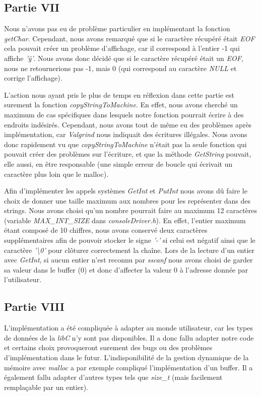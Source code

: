 \documentclass{article}
\begin{document}
\subsection{Partie VII} \label{bugPartieVII}
Nous n'avons pas eu de problème particulier en implémentant la fonction
\textit{getChar}. Cependant, nous avons remarqué que si le caractère récupéré
était \textit{EOF} cela pouvait créer un problème d'affichage, car il
correspond à l'entier -1 qui affiche \textit{'ÿ'}. Nous avons donc décidé que
si le caractère récupéré était un \textit{EOF}, nous ne retournerions pas -1,
mais 0 (qui correspond au caractère \textit{NULL} et corrige l'affichage).

L'action nous ayant pris le plus de temps en réflexion dans cette partie est
surement la fonction \textit{copyStringToMachine}. En effet, nous avons cherché
un maximum de cas spécifiques dans lesquels notre fonction pourrait écrire à des
endroits indésirés. Cependant, nous avons tout de même eu des problèmes après
implémentation, car \textit{Valgrind} nous indiquait des écritures illégales.
Nous avons donc rapidement vu que \textit{copyStringToMachine} n'était pas la
seule fonction qui pouvait créer des problèmes sur l'écriture, et que la
méthode \textit{GetString} pouvait, elle aussi, en être responsable (une simple
erreur de boucle qui écrivait un caractère plus loin que le malloc).

Afin d'implémenter les appels systèmes \textit{GetInt} et \textit{PutInt} nous avons dû
faire le choix de donner une taille maximum aux nombres pour les représenter dans des strings.
Nous avons choisi qu'un nombre pourrait faire au maximum 12 caractères (variable \textit{MAX\_INT\_SIZE} dans
\textit{consoleDriver.h}). En effet, l'entier maximum
étant composé de 10 chiffres, nous avons conservé deux caractères supplémentaires afin de pouvoir stocker
le signe \textit{'-'} si celui est négatif ainsi que le caractère \textit{'\textbackslash0'} pour clôturer correctement
la chaîne. Lors de la lecture d'un entier avec \textit{GetInt}, si aucun entier n'est reconnu par
\textit{sscanf} nous avons choisi de garder sa valeur dans le buffer (0) et donc d'affecter la valeur 0 à l'adresse
donnée par l'utilisateur.

\subsection{Partie VIII}
L'implémentation a été compliquée à adapter au monde utilisateur, car les types de données de la \textit{libC} n'y sont pas disponibles.
Il a donc fallu adapter notre code et certains choix provoqueront surement des bugs ou des problèmes d'implémentation dans le futur. L'indisponibilité
de la gestion dynamique de la mémoire avec \textit{malloc} a par exemple compliqué l'implémentation d'un buffer. Il a également fallu adapter d'autres
types tels que \textit{size\_t} (mais facilement remplaçable par un entier).
\end{document}
